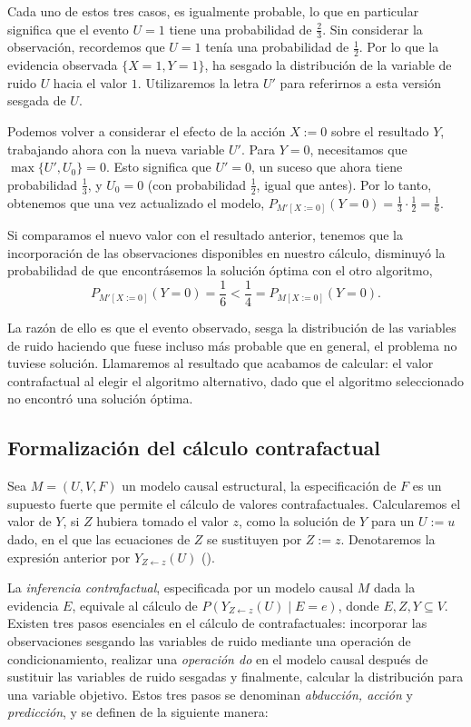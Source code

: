 \documentclass[oneside,openright,titlepage,numbers=noenddot,openany,headinclude,footinclude=true,
cleardoublepage=empty,abstractoff,BCOR=5mm,paper=a4,fontsize=12pt,main=spanish]{scrreprt}
\begin{document}
Cada uno de estos tres casos, es igualmente probable, lo que en particular significa que el evento $U = 1$ tiene una probabilidad de $\frac{2}{3}$. Sin considerar la observación, recordemos que $U = 1$ tenía una probabilidad de $\frac{1}{2}$. Por lo que la evidencia observada $\{X = 1, Y = 1\}$, ha sesgado la distribución de la variable de ruido $U$ hacia el valor $1$. Utilizaremos la letra $U'$ para referirnos a esta versión sesgada de $U$.

Podemos volver a considerar el efecto de la acción $X := 0$ sobre el resultado $Y$, trabajando ahora con la nueva variable $U'$. Para $Y = 0$, necesitamos que $\max \{U', U_0\} = 0$. Esto significa que $U' = 0$, un suceso que ahora tiene probabilidad $\frac{1}{3}$, y $U_0 = 0$ (con probabilidad $\frac{1}{2}$, igual que antes). Por lo tanto, obtenemos que una vez actualizado el modelo, $P_{M'[X:=0]}(Y = 0)=\frac{1}{3}\cdot \frac{1}{2}=\frac{1}{6}$.

Si comparamos el nuevo valor con el resultado anterior, tenemos que la incorporación de las observaciones disponibles en nuestro cálculo, disminuyó la probabilidad de que encontrásemos la solución óptima con el otro algoritmo,
\begin{equation*}
    P_{M'[X:=0]}(Y = 0)=\frac{1}{6} < \frac{1}{4}=P_{M[X:=0]}(Y = 0).
\end{equation*}

La razón de ello es que el evento observado, sesga la distribución de las variables de ruido haciendo que fuese incluso más probable que en general, el problema no tuviese solución. Llamaremos al resultado que acabamos de calcular: el valor contrafactual al elegir el algoritmo alternativo, dado que el algoritmo seleccionado no encontró una solución óptima.


\subsection{Formalización del cálculo contrafactual}

Sea $M=(U,V,F)$ un modelo causal estructural, la especificación de $F$ es un supuesto fuerte que permite el cálculo de valores contrafactuales. Calcularemos el valor de $Y$, si $Z$ hubiera tomado el valor $z$, como la solución de $Y$ para un $U := u$ dado, en el que las ecuaciones de $Z$ se sustituyen por $Z := z$. Denotaremos la expresión anterior por $Y_{Z\leftarrow z}(U)$ (\cite{causality2000}).

La \textit{inferencia contrafactual}, especificada por un modelo causal $M$ dada la evidencia $E$, equivale al cálculo de $P(Y_{Z\leftarrow z}(U) \mid E = e)$, donde $E, Z, Y \subseteq V$. Existen tres pasos esenciales en el cálculo de contrafactuales: incorporar las observaciones sesgando las variables de ruido mediante una operación de condicionamiento, realizar una \textit{operación do} en el modelo causal después de sustituir las variables de ruido sesgadas y finalmente, calcular la distribución para una variable objetivo. Estos tres pasos se denominan \textit{abducción, acción} y \textit{predicción}, y se definen de la siguiente manera:\\
\end{document}
